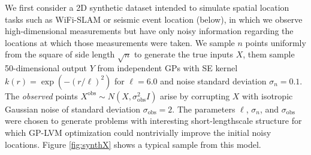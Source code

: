 \documentclass{article}
\begin{document}
We first consider a 2D synthetic dataset intended to simulate spatial location tasks such as WiFi-SLAM
\cite{ferris2007wifi} or seismic event location (below), in which we
observe high-dimensional measurements but have only noisy information
regarding the locations at which those measurements were
taken. We sample $n$ points uniformly from the square of side length
$\sqrt{n}$ to generate the true inputs $X$, them sample 50-dimensional output $Y$ from independent GPs
with SE kernel $k(r) = \exp(-(r/\ell)^2)$ for $\ell=6.0$ and noise standard deviation
$\sigma_n = 0.1$. The {\em observed} points
$X^\text{obs} \sim N(X, \sigma^2_\text{obs}I)$ arise by corrupting $X$ with
isotropic Gaussian noise of standard deviation
$\sigma_\text{obs}=2$. The parameters $\ell$, $\sigma_n$, and
$\sigma_\text{obs}$ were chosen to generate problems with
interesting short-lengthscale structure for which
GP-LVM optimization could nontrivially improve the initial noisy locations. Figure \ref{fig:synthX} shows a typical sample from this model.
\end{document}
